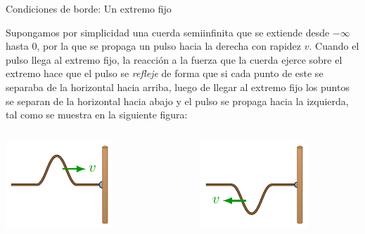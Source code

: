 \documentclass[11pt,handout,aspectratio=1610]{beamer}
\begin{document}
\begin{frame}{Condiciones de borde: Un extremo fijo}

    Supongamos por simplicidad una cuerda semiinfinita que se extiende desde $-\infty$ hasta $0$, por la que se propaga un pulso hacia la derecha con rapidez $v$. Cuando el pulso llega al extremo fijo, la reacción a la fuerza que la cuerda ejerce sobre el extremo hace que el pulso se \emph{refleje} de forma que si cada punto de este se separaba de la horizontal hacia arriba, luego de llegar al extremo fijo los puntos se separan de la horizontal hacia abajo y el pulso se propaga hacia la izquierda, tal como se muestra en la siguiente figura:
    \begin{columns}
        \begin{column}{0.45\textwidth}
            \includegraphics[width=\textwidth]{../figs/waves_reflection_transmission-1.pdf}
        \end{column}
        ~
        \begin{column}{0.45\textwidth}
            \includegraphics[width=\textwidth]{../figs/waves_reflection_transmission-2.pdf}
        \end{column}
    \end{columns}


\end{frame}
\end{document}
